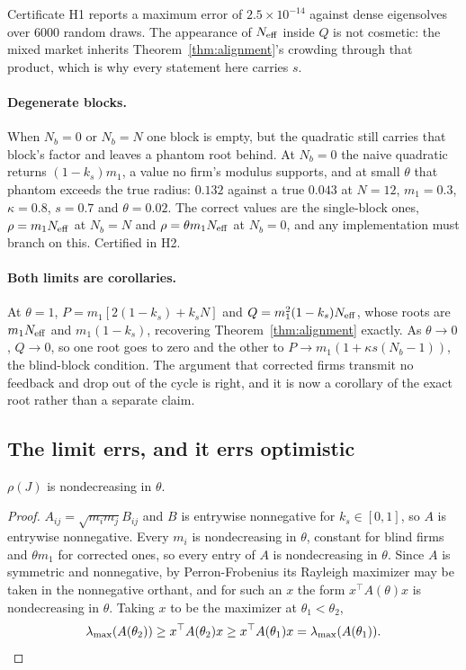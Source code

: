 Certificate H1 reports a maximum error of $2.5\times 10^{-14}$ against dense eigensolves over 6000 random draws. The appearance of $N_{\mathrm{eff}}$ inside $Q$ is not cosmetic: the mixed market inherits Theorem~\ref{thm:alignment}'s crowding through that product, which is why every statement here carries $s$.

\paragraph{Degenerate blocks.} When $N_b = 0$ or $N_b = N$ one block is empty, but the quadratic still carries that block's factor and leaves a phantom root behind. At $N_b = 0$ the naive quadratic returns $(1-k_s)m_1$, a value no firm's modulus supports, and at small $\theta$ that phantom exceeds the true radius: $0.132$ against a true $0.043$ at $N=12$, $m_1=0.3$, $\kappa=0.8$, $s=0.7$ and $\theta=0.02$. The correct values are the single-block ones, $\rho = m_1N_{\mathrm{eff}}$ at $N_b=N$ and $\rho = \theta m_1 N_{\mathrm{eff}}$ at $N_b=0$, and any implementation must branch on this. Certified in H2.

\paragraph{Both limits are corollaries.} At $\theta = 1$, $P = m_1[2(1-k_s)+k_sN]$ and $Q = m_1^2(1-k_s)N_{\mathrm{eff}}$, whose roots are $m_1N_{\mathrm{eff}}$ and $m_1(1-k_s)$, recovering Theorem~\ref{thm:alignment} exactly. As $\theta \to 0$, $Q \to 0$, so one root goes to zero and the other to $P \to m_1(1+\kappa s(N_b-1))$, the blind-block condition. The argument that corrected firms transmit no feedback and drop out of the cycle is right, and it is now a corollary of the exact root rather than a separate claim.

\subsection{The limit errs, and it errs optimistic}

\begin{aproposition}
\label{aprop:theta}
$\rho(J)$ is nondecreasing in $\theta$.
\end{aproposition}

\begin{proof}
$A_{ij} = \sqrt{m_im_j}B_{ij}$ and $B$ is entrywise nonnegative for $k_s \in [0,1]$, so $A$ is entrywise nonnegative. Every $m_i$ is nondecreasing in $\theta$, constant for blind firms and $\theta m_1$ for corrected ones, so every entry of $A$ is nondecreasing in $\theta$. Since $A$ is symmetric and nonnegative, by Perron-Frobenius its Rayleigh maximizer may be taken in the nonnegative orthant, and for such an $x$ the form $x^{\top}A(\theta)x$ is nondecreasing in $\theta$. Taking $x$ to be the maximizer at $\theta_1 < \theta_2$,
\[
  \lambda_{\max}(A(\theta_2)) \geq x^{\top}A(\theta_2)x \geq x^{\top}A(\theta_1)x = \lambda_{\max}(A(\theta_1)). \qedhere
\]
\end{proof}

